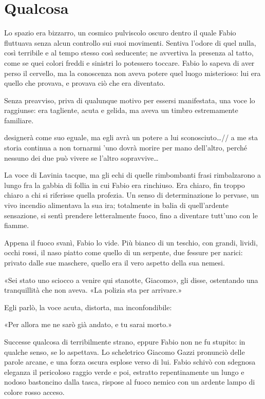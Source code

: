\chapter{Qualcosa}

Lo spazio era bizzarro, un cosmico pulviscolo oscuro dentro il quale Fabio fluttuava senza alcun controllo sui suoi movimenti. Sentiva l'odore di quel nulla, così terribile e al tempo stesso così seducente; ne avvertiva la presenza al tatto, come se quei colori freddi e sinistri lo potessero toccare. Fabio lo sapeva di aver perso il cervello, ma la conoscenza non aveva potere quel luogo misterioso: lui era quello che provava, e provava ciò che era diventato.

Senza preavviso, priva di qualunque motivo per essersi manifestata, una voce lo raggiunse: era tagliente, acuta e gelida, ma aveva un timbro estremamente familiare.

\ldotslo designerà come suo eguale, ma egli avrà un potere a lui sconosciuto\ldots // a me sta storia continua a non tornarmi
\ldotsl'uno dovrà morire per mano dell'altro, perché nessuno dei due può vivere se l'altro sopravvive\ldots

La voce di Lavinia tacque, ma gli echi di quelle rimbombanti frasi rimbalzarono a lungo fra la gabbia di follia in cui Fabio era rinchiuso. Era chiaro, fin troppo chiaro a chi si riferisse quella profezia. Un senso di determinazione lo pervase, un vivo incendio alimentava la sua ira; totalmente in balia di quell'ardente sensazione, si sentì prendere letteralmente fuoco, fino a diventare tutt'uno con le fiamme.

Appena il fuoco svanì, Fabio lo vide. Più bianco di un teschio, con grandi, lividi, occhi rossi, il naso piatto come quello di un serpente, due fessure per narici: privato dalle sue maschere, quello era il vero aspetto della sua nemesi.

«Sei stato uno sciocco a venire qui stanotte, Giacomo», gli disse, ostentando una tranquillità che non aveva. «La polizia sta per arrivare.»

Egli parlò, la voce acuta, distorta, ma inconfondibile:

«Per allora me ne sarò già andato, e tu sarai morto.»

Successe qualcosa di terribilmente strano, eppure Fabio non ne fu stupito: in qualche senso, se lo aspettava. Lo scheletrico Giacomo Gazzi pronunciò delle parole arcane, e una forza oscura esplose verso di lui. Fabio schivò con sdegnosa eleganza il pericoloso raggio verde e poi, estratto repentinamente un lungo e nodoso bastoncino dalla tasca, rispose al fuoco nemico con un ardente lampo di colore rosso acceso.

